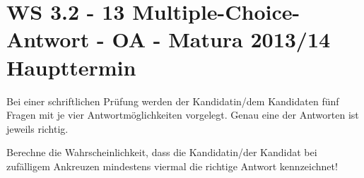 \section{WS 3.2 - 13 Multiple-Choice-Antwort - OA - Matura 2013/14 Haupttermin}

\begin{beispiel}[WS 3.2]{1} %
				Bei einer schriftlichen Prüfung werden der Kandidatin/dem Kandidaten fünf Fragen mit je vier Antwortmöglichkeiten vorgelegt. Genau eine der Antworten ist jeweils richtig.
				
				Berechne die Wahrscheinlichkeit, dass die Kandidatin/der Kandidat bei zufälligem Ankreuzen mindestens viermal die richtige Antwort kennzeichnet!
				
\end{beispiel}